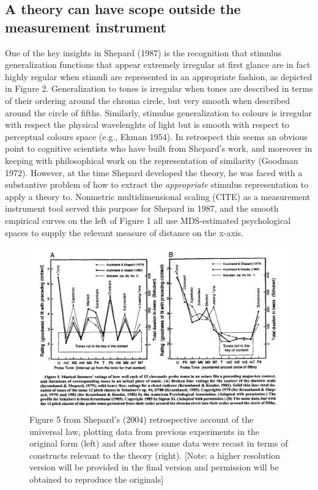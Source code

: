 \documentclass[english,doc]{apa6}
\begin{document}
\hypertarget{a-theory-can-have-scope-outside-the-measurement-instrument}{%
\subsection{A theory can have scope outside the measurement instrument}\label{a-theory-can-have-scope-outside-the-measurement-instrument}}

One of the key insights in Shepard (1987) is the recognition that stimulus generalization functions that appear extremely irregular at first glance are in fact highly regular when stimuli are represented in an appropriate fashion, as depicted in Figure 2. Generalization to tones is irregular when tones are described in terms of their ordering around the chroma circle, but very smooth when described around the circle of fifths. Similarly, stimulus generalization to colours is irregular with respect the physical wavelenghts of light but is smooth with respect to perceptual colours space (e.g., Ekman 1954). In retrospect this seems an obvious point to cognitive scientists who have built from Shepard's work, and moreover in keeping with philosophical work on the representation of similarity (Goodman 1972). However, at the time Shepard developed the theory, he was faced with a substantive problem of how to extract the \emph{appropriate} stimulus representation to apply a theory to. Nonmetric multidimensional scaling (CITE) as a measurement instrument tool served this purpose for Shepard in 1987, and the smooth empirical curves on the left of Figure 1 all use MDS-estimated psychological spaces to supply the relevant measure of distance on the x-axis.



\begin{figure}[t]
\includegraphics[width=5.71in]{shepard2} \caption{Figure 5 from Shepard's (2004) retrospective account of the universal law, plotting data from previous experiments in the original form (left) and after those same data were recast in terms of constructs relevant to the theory (right). {[}Note: a higher resolution version will be provided in the final version and permission will be obtained to reproduce the originals{]}}\label{fig:unnamed-chunk-2}
\end{figure}
\end{document}
